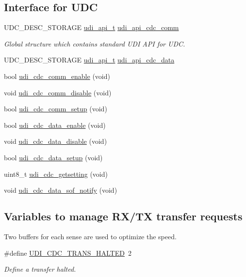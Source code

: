 \subsection*{\-Interface for \-U\-D\-C}
\begin{DoxyCompactItemize}
\item 
\-U\-D\-C\-\_\-\-D\-E\-S\-C\-\_\-\-S\-T\-O\-R\-A\-G\-E \hyperlink{structudi__api__t}{udi\-\_\-api\-\_\-t} \hyperlink{group__udi__cdc__group_gad7b0a90350a1f1a7c62fab1a749bf687}{udi\-\_\-api\-\_\-cdc\-\_\-comm}
\begin{DoxyCompactList}\small\item\em \-Global structure which contains standard \-U\-D\-I \-A\-P\-I for \-U\-D\-C. \end{DoxyCompactList}\item 
\-U\-D\-C\-\_\-\-D\-E\-S\-C\-\_\-\-S\-T\-O\-R\-A\-G\-E \hyperlink{structudi__api__t}{udi\-\_\-api\-\_\-t} \hyperlink{group__udi__cdc__group_ga3f85c229cc3218b75cb4844b8e9ad2d7}{udi\-\_\-api\-\_\-cdc\-\_\-data}
\item 
bool \hyperlink{group__udi__cdc__group_ga48b8cd17138f1e31d2f705e47bd798fc}{udi\-\_\-cdc\-\_\-comm\-\_\-enable} (void)
\item 
void \hyperlink{group__udi__cdc__group_ga1d9234e7ec38cb7fbc306b1d4624ac7d}{udi\-\_\-cdc\-\_\-comm\-\_\-disable} (void)
\item 
bool \hyperlink{group__udi__cdc__group_ga9f1ce6a914bf00a929285d4b9876ff6c}{udi\-\_\-cdc\-\_\-comm\-\_\-setup} (void)
\item 
bool \hyperlink{group__udi__cdc__group_gacff97f0d95101ef8beebe3a7d5cf1541}{udi\-\_\-cdc\-\_\-data\-\_\-enable} (void)
\item 
void \hyperlink{group__udi__cdc__group_gad6183b6bb4f836b69c2a176b8a1631da}{udi\-\_\-cdc\-\_\-data\-\_\-disable} (void)
\item 
bool \hyperlink{group__udi__cdc__group_ga9a66dccf928f55850d243abd1ca51eb3}{udi\-\_\-cdc\-\_\-data\-\_\-setup} (void)
\item 
uint8\-\_\-t \hyperlink{group__udi__cdc__group_ga89512d97844e09864336d3df2f73af59}{udi\-\_\-cdc\-\_\-getsetting} (void)
\item 
void \hyperlink{group__udi__cdc__group_ga304bed0ef46f8046e41de6e161db0864}{udi\-\_\-cdc\-\_\-data\-\_\-sof\-\_\-notify} (void)
\end{DoxyCompactItemize}
\subsection*{\-Variables to manage \-R\-X/\-T\-X transfer requests}
\label{_amgrp212b06c4e5cdd346092967876fa4335a}%
 \-Two buffers for each sense are used to optimize the speed. \begin{DoxyCompactItemize}
\item 
\#define \hyperlink{group__udi__cdc__group_ga91892013c1c5dcb7fa2127ac2e2090f7}{\-U\-D\-I\-\_\-\-C\-D\-C\-\_\-\-T\-R\-A\-N\-S\-\_\-\-H\-A\-L\-T\-E\-D}~2
\begin{DoxyCompactList}\small\item\em \-Define a transfer halted. \end{DoxyCompactList}\end{DoxyCompactItemize}
